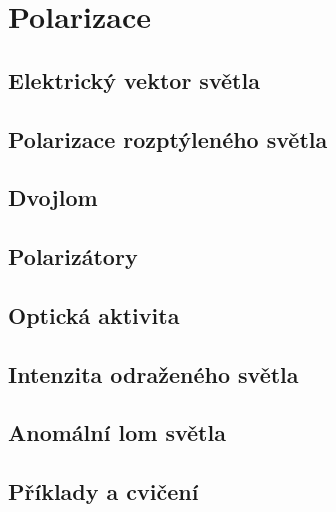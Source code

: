 {
\chapter{Polarizace}\label{fyz:IchapXXXIII}
\minitoc
  \section{Elektrický vektor světla}\label{fyz:IchapXXXIIIsecI}
  \section{Polarizace rozptýleného světla}\label{fyz:IchapXXXIIIsecII}
  \section{Dvojlom}\label{fyz:IchapXXXIIIsecIII}
  \section{Polarizátory}\label{fyz:IchapXXXIIIsecIV}
  \section{Optická aktivita}\label{fyz:IchapXXXIIIsecV}
  \section{Intenzita odraženého světla}\label{fyz:IchapXXXIIIsecVI}
  \section{Anomální lom světla}\label{fyz:IchapXXXIIIsecVIII}
  \section{Příklady a cvičení}\label{fyz:IchapXXXIIIsecIX}

}
